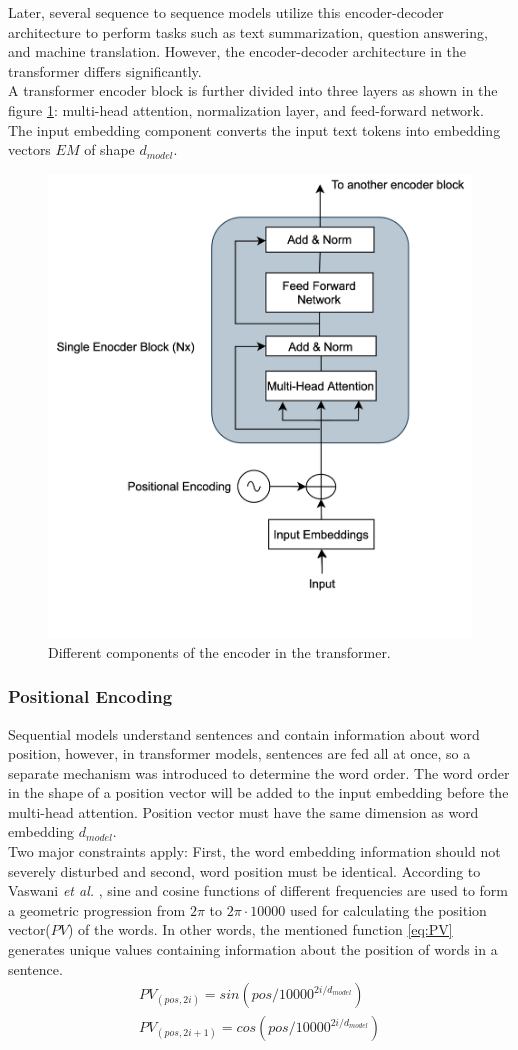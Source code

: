 \documentclass[%
	BCOR=8mm, %
	DIV=12,
	toc=bibliography, %
	toc=listof, %
	oneside, %
	egregdoesnotlikesansseriftitles, %
	]{scrbook}
\begin{document}
 Later, several sequence to sequence models utilize this encoder-decoder architecture to perform tasks such as text summarization, question answering, and machine translation. However, the encoder-decoder architecture in the transformer differs significantly.\\
A transformer encoder block is further divided into three layers as shown in the figure \ref{diag:EncoderArch}: multi-head attention, normalization layer, and feed-forward network. The input embedding component converts the input text tokens into embedding vectors $EM$ of shape $d_{model}$.
\begin{figure}[H]
\centering
\includegraphics[width=.50\textwidth]{img/EncoderArch.png}
\caption[Different components of an encoder in transformer]{Different components of the encoder in the transformer.}
\label{diag:EncoderArch}
\end{figure}
\subsubsection{Positional Encoding}
Sequential models understand sentences and contain information about word position, however, in transformer models, sentences are fed all at once, so a separate mechanism was introduced to determine the word order. The word order in the shape of a position vector will be added to the input embedding before the multi-head attention. Position vector must have the same dimension as word embedding $d_{model}$.\\
Two major constraints apply: First, the word embedding information should not severely disturbed and second, word position must be identical. According to Vaswani \textit{et al.} \cite{vaswani_attention_2017}, sine and cosine functions of different frequencies are used to form a geometric progression from  $2\pi$ to $2\pi \cdot 10000$ used for calculating the position vector($PV$) of the words. In other words, the mentioned function \ref{eq:PV} generates unique values containing information about the position of words in a sentence.
\begin{equation}
\begin{aligned}
    PV_{(pos,2i)}=sin(pos/10000^{2i/d_{model}})\\
    PV_{(pos,2i+1)}=cos(pos/10000^{2i/d_{model}})
    \label{eq:PV}
\end{aligned}
\end{equation}
\end{document}
